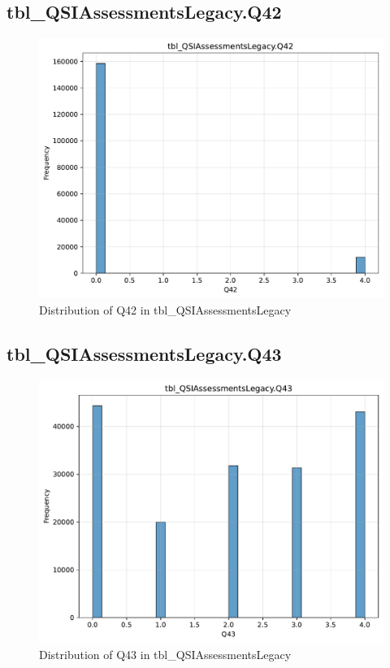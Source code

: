 \subsection{tbl\_QSIAssessmentsLegacy.Q42}

\begin{figure}[htbp]
\centering
\includegraphics[width=\textwidth]{figures/dbo_tbl_QSIAssessmentsLegacy_Q42.pdf}
\caption{Distribution of Q42 in tbl\_QSIAssessmentsLegacy}
\end{figure}\newpage

\subsection{tbl\_QSIAssessmentsLegacy.Q43}

\begin{figure}[htbp]
\centering
\includegraphics[width=\textwidth]{figures/dbo_tbl_QSIAssessmentsLegacy_Q43.pdf}
\caption{Distribution of Q43 in tbl\_QSIAssessmentsLegacy}
\end{figure}\newpage

